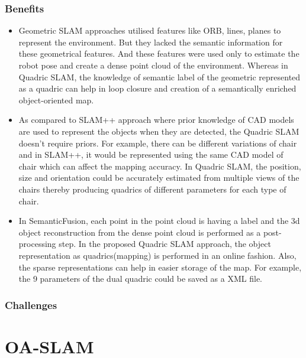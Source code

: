 \documentclass[report.tex]{subfiles}
\begin{document}
\begin{itemize}
\subsubsection{Benefits}
\begin{itemize}
\item Geometric SLAM approaches utilised features like ORB\cite{orbslam}, lines\cite{linesegment}, planes\cite{infiniteplanes} to represent the environment. But they lacked the semantic information for these geometrical features. And these features were used only to estimate the robot pose and create a dense point cloud of the environment. Whereas in Quadric SLAM, the knowledge of semantic label of the geometric represented as a quadric can help in loop closure and creation of a semantically enriched object-oriented map.
\item As compared to SLAM++\cite{slam++} approach where prior knowledge of CAD models are used to represent the objects when they are detected, the Quadric SLAM doesn't require priors. For example, there can be different variations of chair and in SLAM++, it would be represented using the same CAD model of chair which can affect the mapping accuracy. In Quadric SLAM, the position, size and orientation could be accurately estimated from multiple views of the chairs thereby producing quadrics of different parameters for each type of chair.
\item In SemanticFusion\cite{semanticfusion}, each point in the point cloud is having a label and the 3d object reconstruction from the dense point cloud is performed as a post-processing step. In the proposed Quadric SLAM approach, the object representation as quadrics(mapping) is performed in an online fashion. Also, the sparse representations can help in easier storage of the map. For example, the 9 parameters of the dual quadric could be saved as a XML file.

\end{itemize}

\subsubsection{Challenges}







\end{itemize}
    \section{OA-SLAM}
\end{document}
